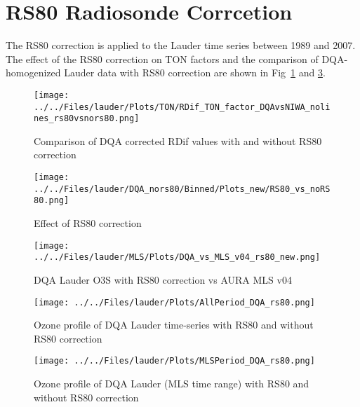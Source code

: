 %
    \section{RS80 Radiosonde Corrcetion}

    The RS80 correction is applied to the Lauder time series between 1989 and 2007. The effect of the RS80 correction on TON factors
and the comparison of DQA-homogenized Lauder data with RS80 correction are shown in Fig~\ref{fig:rdif_rs80} and \ref{fig:mlsrs80}.

                                \begin{figure}
        \centering
\texttt{[image: ../../Files/lauder/Plots/TON/RDif\_TON\_factor\_DQAvsNIWA\_nolines\_rs80vsnors80.png]}
    \caption{Comparison of DQA corrected RDif values with and without RS80 correction}
            \label{fig:rdif_rs80}
    \end{figure}

                                    \begin{figure}
        \centering
\texttt{[image: ../../Files/lauder/DQA\_nors80/Binned/Plots\_new/RS80\_vs\_noRS80.png]}
    \caption{Effect of  RS80 correction}
            \label{fig:heatmap_rs80}
    \end{figure}

                                \begin{figure}
        \centering
\texttt{[image: ../../Files/lauder/MLS/Plots/DQA\_vs\_MLS\_v04\_rs80\_new.png]}
    \caption{ DQA Lauder O3S with RS80 correction vs AURA MLS v04  }
            \label{fig:mlsrs80}
    \end{figure}


                                \begin{figure}
        \centering
\texttt{[image: ../../Files/lauder/Plots/AllPeriod\_DQA\_rs80.png]}
    \caption{Ozone profile of DQA Lauder time-series with RS80 and without RS80 correction  }
            \label{fig:profile_dqa}
    \end{figure}

                                \begin{figure}
        \centering
\texttt{[image: ../../Files/lauder/Plots/MLSPeriod\_DQA\_rs80.png]}
    \caption{Ozone profile of DQA Lauder (MLS time range) with RS80 and without RS80 correction  }
            \label{fig:profile_dqa_mls}
    \end{figure}






